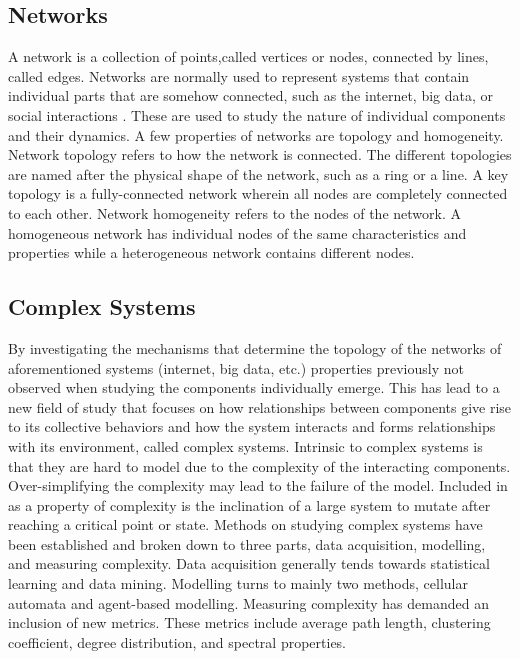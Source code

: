 \subsection{Networks}
A network is a collection of points,called  vertices or nodes, connected by lines, called edges.
Networks are normally used to represent systems that contain individual parts that are somehow connected, such as the internet, big data, or social interactions \cite{networkNewman}. These are used to study the nature of individual components and their dynamics.
A few properties of networks are topology and homogeneity. 
Network topology refers to how the network is connected. 
The different topologies are named after the  physical shape of the network, such as a ring or a line.
A key topology is a fully-connected network wherein all nodes are completely connected to each other\cite{networkEvo}.
Network homogeneity refers to the nodes of the network. A homogeneous network has individual nodes of the same characteristics and properties while a heterogeneous network contains different nodes.

\subsection{Complex Systems}
By investigating the mechanisms that determine the topology of the networks of aforementioned systems (internet, big data, etc.) properties previously not observed when studying the components individually emerge. 
This has lead to a new field of study that focuses on how relationships between components give rise to its collective behaviors and how the system interacts and forms relationships with its environment, called complex systems.
Intrinsic to complex systems is that they are hard to model due to the complexity of the interacting components.
Over-simplifying the complexity may lead to the failure of the model\cite{hownatureworks}.
Included in as a property of complexity is the inclination of a large system to mutate after reaching a critical point or state.
Methods on studying complex systems have been established and broken down to three parts, data acquisition, modelling, and measuring complexity.
Data acquisition generally tends towards statistical learning and data mining. 
Modelling turns to mainly two methods, cellular automata and agent-based modelling\cite{complexSys}.
Measuring complexity has demanded an inclusion of new metrics.
These metrics include average path length, clustering coefficient, degree distribution, and spectral properties\cite{statCS}.

